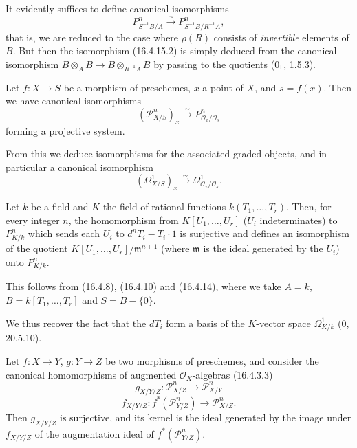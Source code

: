 It evidently suffices to define canonical isomorphisms
\[
  P_{S^{-1}B/A}^n\xrightarrow{\sim}P_{S^{-1}B/R^{-1}A}^n,
  \tag{16.4.15.2}
  \label{IV.16.4.15.2}
\]
that is, we are reduced to the case where $\rho(R)$ consists of
\emph{invertible} elements of $B$. But then the isomorphism (16.4.15.2) is simply
deduced from the canonical isomorphism
$B\otimes_A B\to B\otimes_{R^{-1}A}B$ by passing to the quotients
(0$_{\rm I}$, 1.5.3).

\begin{corollary}[16.4.16]
\label{IV.16.4.16}
Let $f:X\to S$ be a morphism of preschemes, $x$ a point of $X$, and
$s=f(x)$. Then we have canonical isomorphisms
\[
  (\mathscr{P}_{X/S}^n)_x\xrightarrow{\sim}
  P_{\mathcal{O}_x/\mathcal{O}_s}^n
  \tag{16.4.16.1}
  \label{IV.16.4.16.1}
\]
forming a projective system.
\end{corollary}

From this we deduce isomorphisms for the associated graded objects, and in
particular a canonical isomorphism
\[
  (\Omega_{X/S}^1)_x\xrightarrow{\sim}
  \Omega_{\mathcal{O}_x/\mathcal{O}_s}^1.
  \tag{16.4.16.2}
  \label{IV.16.4.16.2}
\]

\begin{corollary}[16.4.17]
\label{IV.16.4.17}
Let $k$ be a field and $K$ the field of rational functions
$k(T_1,\ldots,T_r)$. Then, for every integer $n$, the homomorphism from
$K[U_1,\ldots,U_r]$ ($U_i$ indeterminates) to $P_{K/k}^n$ which sends
each $U_i$ to $d^nT_i-T_i\cdot1$ is surjective and defines an isomorphism
of the quotient $K[U_1,\ldots,U_r]/\mathfrak{m}^{n+1}$ (where $\mathfrak{m}$ is
the ideal generated by the $U_i$) onto $P_{K/k}^n$.
\end{corollary}

This follows from (16.4.8), (16.4.10) and (16.4.14), where we take $A=k$,
$B=k[T_1,\ldots,T_r]$ and $S=B-\{0\}$.

We thus recover the fact that the $dT_i$ form a basis of the $K$-vector
space $\Omega_{K/k}^1$ (0, 20.5.10).

\begin{proposition}[16.4.18]
\label{IV.16.4.18}
Let $f:X\to Y$, $g:Y\to Z$ be two morphisms of preschemes, and consider
the canonical homomorphisms of augmented $\mathcal{O}_X$-algebras
(16.4.3.3)
\[
  g_{X/Y/Z}:\mathscr{P}_{X/Z}^n\longrightarrow\mathscr{P}_{X/Y}^n
  \tag{16.4.18.1}
  \label{IV.16.4.18.1}
\]
\[
  f_{X/Y/Z}:f^*(\mathscr{P}_{Y/Z}^n)
  \longrightarrow\mathscr{P}_{X/Z}^n.
  \tag{16.4.18.2}
  \label{IV.16.4.18.2}
\]
Then $g_{X/Y/Z}$ is surjective, and its kernel is the ideal generated by the
image under $f_{X/Y/Z}$ of the augmentation ideal of
$f^*(\mathscr{P}_{Y/Z}^n)$.
\end{proposition}

